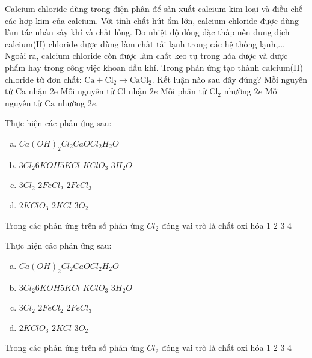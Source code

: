 \begin{ex}Calcium chloride dùng trong điện phân để sản xuất calcium kim loại và điều chế các hợp kim của calcium. Với tính chất hút ẩm lớn, calcium chloride được dùng làm tác nhân sấy khí và chất lỏng. Do nhiệt độ đông đặc thấp nên dung dịch calcium(II) chloride được dùng làm chất tải lạnh trong các hệ thống lạnh,... Ngoài ra, calcium chloride còn được làm chất keo tụ trong hóa dược và dược phẩm hay trong công việc khoan dầu khí.
Trong phản ứng tạo thành calcium(II) chloride từ đơn chất: $\mathrm{Ca}+\mathrm{Cl}_2\to \mathrm{CaCl}_2$. Kết luận nào sau đây đúng?
	\choice
	{Mỗi nguyên tử Ca nhận 2e}
	{Mỗi nguyên tử $\mathrm{Cl}$ nhận $2e$}
	{Mỗi phân tử $\mathrm{Cl}_2$ nhường $2e$}
	{\True Mỗi nguyên tử $\mathrm{Ca}$ nhường $2e$.}
\end{ex}
\begin{ex}Thực hiện các phản ứng sau:
	\begin{enumerate}[a)]
		\item $Ca(OH)_2$\explus$Cl_2$\MuiTen$CaOCl_2$\explus $H_2O$
		\item $3Cl_2$\explus$6KOH$\MuiTen[$t^{\circ}$][][][-1] $5KCl$ \explus $KClO_3$ \explus $3H_2O$
		\item $3Cl_2$ \explus $2FeCl_2$ \MuiTen $2FeCl_3$
		\item $2KClO_3$ \MuiTen[$t^{\circ}$][][][-1] $2KCl$ \explus $3O_2$
	\end{enumerate}
	Trong các phản ứng trên số phản ứng  $Cl_2$ đóng vai trò là chất oxi hóa
	\choice
	{$1$}
	{\True$2$}
	{$3$}
	{$4$}
\end{ex}
\begin{ex}Thực hiện các phản ứng sau:
	\begin{enumerate}[a)]
		\item $Ca(OH)_2$\explus$Cl_2$\MuiTen$CaOCl_2$\explus $H_2O$
		\item $3Cl_2$\explus$6KOH$\MuiTen[$t^{\circ}$][][][-1] $5KCl$ \explus $KClO_3$ \explus $3H_2O$
		\item $3Cl_2$ \explus $2FeCl_2$ \MuiTen $2FeCl_3$
		\item $2KClO_3$ \MuiTen[$t^{\circ}$][][][-1] $2KCl$ \explus $3O_2$
	\end{enumerate}
	Trong các phản ứng trên số phản ứng  $Cl_2$ đóng vai trò là chất oxi hóa
	\choice
	{$1$}
	{\True$2$}
	{$3$}
	{$4$}
\end{ex}

